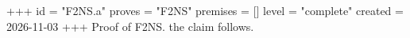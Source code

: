 +++
id = "F2NS.a"
proves = "F2NS"
premises = []
level = "complete"
created = 2026-11-03
+++
Proof of F2NS. the claim follows.
